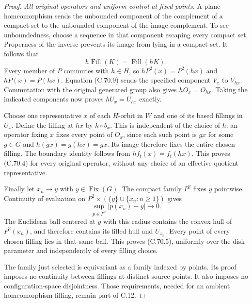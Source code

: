 \begin{proof}
\emph{All original operators and uniform control at fixed points.}
A plane homeomorphism sends the unbounded component
of the complement of a compact set to the unbounded
component of the image complement. To see unboundedness,
choose a sequence in that component escaping every
compact set. Properness of the inverse prevents its
image from lying in a compact set. It follows that
\[
          h\operatorname{Fill}(K)=\operatorname{Fill}(hK).
                                                               \tag{C.70.9}
\]
Every member of $P$ commutes with $h\in H$, so
$hP^2(x)=P^2(hx)$ and $hP(x)=P(hx)$.
Equation (C.70.9) sends the specified component $V_x$
to $V_{hx}$. Commutation with the original generated
group also gives $hO_x=O_{hx}$. Taking the indicated
components now proves $hU_x=U_{hx}$ exactly.

Choose one representative $x$ of each $H$-orbit in
$W$ and one of its based fillings in $U_x$. Define
the filling at $hx$ by $h\circ b_x$. This is independent
of the choice of $h$: an operator fixing $x$ fixes
every point of $O_x$, since each such point is $gx$
for some $g\in G$ and $h(gx)=g(hx)=gx$.
Its image therefore fixes the entire chosen filling.
The boundary identity follows from $hf_t(x)=f_t(hx)$.
This proves (C.70.4) for every original operator,
without any choice of an effective quotient representative.

Finally let $x_n\to y$ with $y\in\operatorname{Fix}(G)$.
The compact family $P^2$ fixes $y$ pointwise. Continuity
of evaluation on
$P^2\times(\{y\}\cup\{x_n:n\geq1\})$ gives
\[
             \sup_{p\in P^2}|p(x_n)-y|\longrightarrow0.
                                                               \tag{C.70.10}
\]
The Euclidean ball centered at $y$ with this radius
contains the convex hull of $P^2(x_n)$, and therefore
contains its filled hull and $U_{x_n}$. Every point of
every chosen filling lies in that same ball. This
proves (C.70.5), uniformly over the disk parameter
and independently of every filling choice.

The family just selected is equivariant as a family
indexed by points. Its proof imposes no continuity
between fillings at distinct source points. It also
imposes no configuration-space disjointness. Those
requirements, needed for an ambient homeomorphism
filling, remain part of C.12.
\end{proof}

